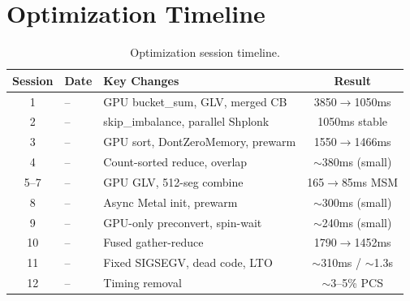 \documentclass[11pt,a4paper]{article}
\begin{document}
\appendix
\section{Optimization Timeline}

\begin{table}[H]
\centering
\small
\begin{tabular}{cllc}
\toprule
\textbf{Session} & \textbf{Date} & \textbf{Key Changes} & \textbf{Result} \\
\midrule
1 & -- & GPU bucket\_sum, GLV, merged CB & 3850$\to$1050ms \\
2 & -- & skip\_imbalance, parallel Shplonk & 1050ms stable \\
3 & -- & GPU sort, DontZeroMemory, prewarm & 1550$\to$1466ms \\
4 & -- & Count-sorted reduce, overlap & $\sim$380ms (small) \\
5--7 & -- & GPU GLV, 512-seg combine & 165$\to$85ms MSM \\
8 & -- & Async Metal init, prewarm & $\sim$300ms (small) \\
9 & -- & GPU-only preconvert, spin-wait & $\sim$240ms (small) \\
10 & -- & Fused gather-reduce & 1790$\to$1452ms \\
11 & -- & Fixed SIGSEGV, dead code, LTO & $\sim$310ms / $\sim$1.3s \\
12 & -- & Timing removal & $\sim$3--5\% PCS \\
\bottomrule
\end{tabular}
\caption{Optimization session timeline.}
\end{table}
\end{document}
